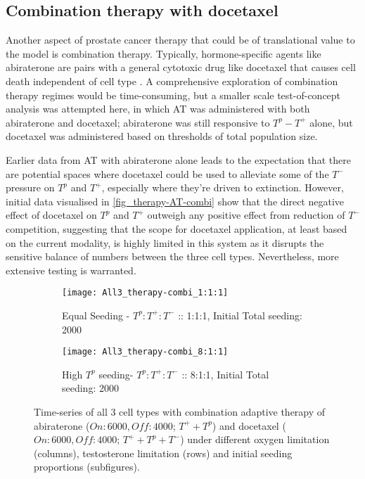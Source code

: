 \newpage
\subsection{Combination therapy with docetaxel}
Another aspect of prostate cancer therapy that could be of translational value to the model is combination therapy. Typically, hormone-specific agents like abiraterone are pairs with a general cytotoxic drug like docetaxel that causes cell death independent of cell type \cite{West}. A comprehensive exploration of combination therapy regimes would be time-consuming, but a smaller scale test-of-concept analysis was attempted here, in which AT was administered with both abiraterone and docetaxel; abiraterone was still responsive to $T^p - T^+$ alone, but docetaxel was administered based on thresholds of total population size.

Earlier data from AT with abiraterone alone leads to the expectation that there are potential spaces where docetaxel could be used to alleviate some of the $T^-$ pressure on $T^p$ and $T^+$, especially where they’re driven to extinction. However, initial data visualised in \autoref{fig_therapy-AT-combi} show that the direct negative effect of docetaxel on $T^p$ and $T^+$ outweigh any positive effect from reduction of $T^-$ competition, suggesting that the scope for docetaxel application, at least based on the current modality, is highly limited in this system as it disrupts the sensitive balance of numbers between the three cell types. Nevertheless, more extensive testing is warranted.

\begin{figure}
  \centering
  \begin{subfigure}[b]{\textwidth}
    \centering
    \texttt{[image: All3\_therapy-combi\_1:1:1]}
    \caption{Equal Seeding - $T^p:T^+:T^-$ :: 1:1:1, Initial Total seeding: 2000}
    \label{fig_therapy-AT-combi_1:1:1-2000}
  \end{subfigure}
  \begin{subfigure}[b]{\textwidth}
    \centering
    \texttt{[image: All3\_therapy-combi\_8:1:1]}
    \caption{High $T^p$ seeding- $T^p:T^+:T^-$ :: 8:1:1, Initial Total seeding: 2000}
    \label{fig_therapy-AT_combi_8:1:1-2000}
  \end{subfigure}
  \caption[Time-series of all 3 cell types with combination adaptive therapy]{Time-series of all 3 cell types with combination adaptive therapy of abiraterone ($On:6000, Off:4000$; $T^+ + T^p$) and docetaxel ($On:6000, Off:4000$; $T^+ + T^p + T^-$) under different oxygen limitation (columns), testosterone limitation (rows) and initial seeding proportions (subfigures).}
  \label{fig_therapy-AT-combi}
\end{figure}
